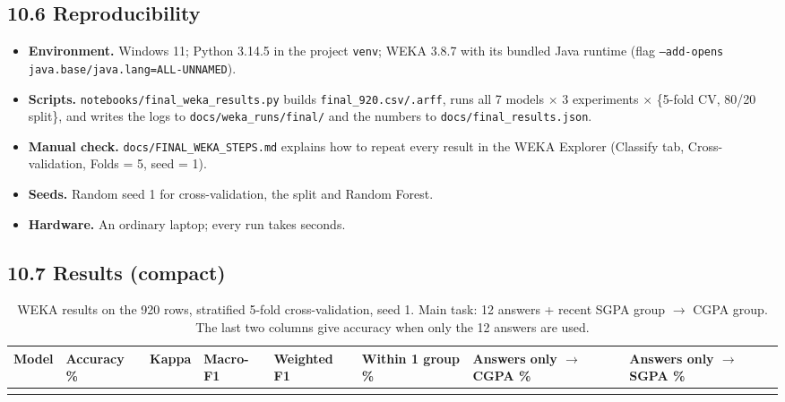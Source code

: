 \documentclass[11pt,a4paper]{article}
\newcommand{\hd}[1]{\textbf{#1}}
\begin{document}
\subsection{10.6 Reproducibility}
\begin{itemize}
\item \textbf{Environment.} Windows 11; Python 3.14.5 in the project \texttt{venv}; WEKA 3.8.7 with its bundled Java runtime (flag \texttt{--add-opens java.base/java.lang=ALL-UNNAMED}).
\item \textbf{Scripts.} \texttt{notebooks/final\_weka\_results.py} builds \texttt{final\_920.csv/.arff}, runs all 7 models $\times$ 3 experiments $\times$ \{5-fold CV, 80/20 split\}, and writes the logs to \texttt{docs/weka\_runs/final/} and the numbers to \texttt{docs/final\_results.json}.
\item \textbf{Manual check.} \texttt{docs/FINAL\_WEKA\_STEPS.md} explains how to repeat every result in the WEKA Explorer (Classify tab, Cross-validation, Folds = 5, seed = 1).
\item \textbf{Seeds.} Random seed 1 for cross-validation, the split and Random Forest.
\item \textbf{Hardware.} An ordinary laptop; every run takes seconds.
\end{itemize}

\subsection{10.7 Results (compact)}
\begin{table}[!htbp]
\centering\small
\caption{WEKA results on the 920 rows, stratified 5-fold cross-validation, seed 1. Main task: 12 answers + recent SGPA group $\rightarrow$ CGPA group. The last two columns give accuracy when only the 12 answers are used.}
\label{tab:results}
\begin{tabularx}{\linewidth}{|Y|R{14mm}|R{11mm}|R{13mm}|R{15mm}|R{15mm}|R{17mm}|R{17mm}|}
\hline
{}\hd{Model} & \hd{Accuracy \%} & \hd{Kappa} & \hd{Macro-F1} & \hd{Weighted F1} & \hd{Within 1 group \%} & \hd{Answers only $\rightarrow$ CGPA \%} & \hd{Answers only $\rightarrow$ SGPA \%} \\ \hline
{}
\end{tabularx}
\end{table}
\end{document}
